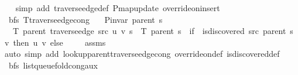 \begin{isabellebody}
\ \ \isamarkupfalse%
\ {\isacharparenleft}{\kern0pt}simp\ add{\isacharcolon}{\kern0pt}\ traverse{\isacharunderscore}{\kern0pt}edge{\isacharunderscore}{\kern0pt}def\ P{\isachardot}{\kern0pt}map{\isacharunderscore}{\kern0pt}update\ override{\isacharunderscore}{\kern0pt}on{\isacharunderscore}{\kern0pt}insert{\isacharprime}{\kern0pt}{\isacharparenright}{\kern0pt}%
\endisatagproof
{\isafoldproof}%
%
\isadelimproof
\isanewline
%
\endisadelimproof
\isanewline
{}\isamarkupfalse%
\ {\isacharparenleft}{\kern0pt}\ bfs{\isacharparenright}{\kern0pt}\ T{\isacharunderscore}{\kern0pt}traverse{\isacharunderscore}{\kern0pt}edge{\isacharunderscore}{\kern0pt}cong{\isacharcolon}{\kern0pt}\isanewline
\ \ \ {\isachardoublequoteopen}P{\isacharunderscore}{\kern0pt}invar\ {\isacharparenleft}{\kern0pt}parent\ s{\isacharparenright}{\kern0pt}{\isachardoublequoteclose}\isanewline
\ \ \ {\isachardoublequoteopen}T\ {\isacharparenleft}{\kern0pt}parent\ {\isacharparenleft}{\kern0pt}traverse{\isacharunderscore}{\kern0pt}edge\ src\ u\ v\ s{\isacharparenright}{\kern0pt}{\isacharparenright}{\kern0pt}\ {\isacharequal}{\kern0pt}\ T\ {\isacharparenleft}{\kern0pt}parent\ s{\isacharparenright}{\kern0pt}\ {\isasymunion}\ {\isacharparenleft}{\kern0pt}if\ {\isasymnot}\ is{\isacharunderscore}{\kern0pt}discovered\ src\ {\isacharparenleft}{\kern0pt}parent\ s{\isacharparenright}{\kern0pt}\ v\ then\ {\isacharbraceleft}{\kern0pt}{\isacharparenleft}{\kern0pt}u{\isacharcomma}{\kern0pt}\ v{\isacharparenright}{\kern0pt}{\isacharbraceright}{\kern0pt}\ else\ {\isacharbraceleft}{\kern0pt}{\isacharbraceright}{\kern0pt}{\isacharparenright}{\kern0pt}{\isachardoublequoteclose}\isanewline
%
\isadelimproof
\ \ %
\endisadelimproof
%
\isatagproof
{}\isamarkupfalse%
\ assms\isanewline
\ \ \isamarkupfalse%
\ {\isacharparenleft}{\kern0pt}auto\ simp\ add{\isacharcolon}{\kern0pt}\ lookup{\isacharunderscore}{\kern0pt}parent{\isacharunderscore}{\kern0pt}traverse{\isacharunderscore}{\kern0pt}edge{\isacharunderscore}{\kern0pt}cong\ override{\isacharunderscore}{\kern0pt}on{\isacharunderscore}{\kern0pt}def\ is{\isacharunderscore}{\kern0pt}discovered{\isacharunderscore}{\kern0pt}def{\isacharparenright}{\kern0pt}%
\endisatagproof
{\isafoldproof}%
%
\isadelimproof
\isanewline
%
\endisadelimproof
%
\isadeliminvisible
\isanewline
%
\endisadeliminvisible
%
\isataginvisible
{}\isamarkupfalse%
\ {\isacharparenleft}{\kern0pt}\ bfs{\isacharparenright}{\kern0pt}\ list{\isacharunderscore}{\kern0pt}queue{\isacharunderscore}{\kern0pt}fold{\isacharunderscore}{\kern0pt}cong{\isacharunderscore}{\kern0pt}aux{\isacharcolon}{\kern0pt}\isanewline

\end{isabellebody}

